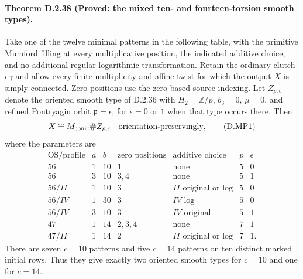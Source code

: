 \paragraph{Theorem D.2.38 (Proved: the mixed ten- and fourteen-torsion smooth types).}
Take one of the twelve minimal patterns in the following table,
with the primitive Mumford filling at every multiplicative position,
the indicated additive choice, and no additional regular logarithmic
transformation. Retain the ordinary clutch $e\gamma$ and allow every
finite multiplicity and affine twist for which the output $X$ is
simply connected. Zero positions use the zero-based source indexing.
Let $Z_{p,\epsilon}$ denote the oriented smooth type of D.2.36 with
$H_2=\mathbb Z/p$, $b_3=0$, $\mu=0$, and refined Pontryagin
orbit $\mathfrak p=\epsilon$, for $\epsilon=0$ or $1$ when that
type occurs there. Then
\[
                  X\cong M_{\mathrm{conic}}\# Z_{p,\epsilon}
                     \quad\hbox{orientation-preservingly},
                                                        \tag{D.MP1}
\]
where the parameters are
\[
\begin{array}{c|r|r|l|l|r|r}
\text{OS/profile}&a&b&\text{zero positions}&\text{additive choice}&p&\epsilon\\\hline
56&1&10&1&\text{none}&5&0\\
56&3&10&3,4&\text{none}&5&1\\
56/II&1&10&3&II\text{ original or log}&5&0\\
56/IV&1&30&3&IV\text{ log}&5&0\\
56/IV&3&10&3&IV\text{ original}&5&1\\
47&1&14&2,3,4&\text{none}&7&1\\
47/II&1&14&2&II\text{ original or log}&7&1.
\end{array}                                               \tag{D.MP2}
\]
There are seven $c=10$ patterns and five $c=14$ patterns on ten
distinct marked initial rows. Thus they give exactly two oriented
smooth types for $c=10$ and one for $c=14$.

